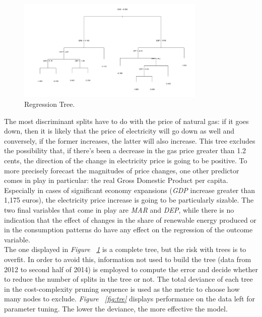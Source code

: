 \documentclass[a4paper,12pt]{book}
\begin{document}
\begin{figure}[tb]
\begin{center}
\captionsetup{justification=centering}
\includegraphics[width=0.8\textwidth]{Images/plot.png}
\caption{Regression Tree.}
\label{fig:plot}
\end{center}
\end{figure}

The most discriminant splits have to do with the price of natural gas: if it goes down, then it is likely that the price of electricity will go down as well and conversely, if the former increases, the latter will also increase. This tree excludes the possibility that, if there's been a decrease in the gas price greater than 1.2 cents, the direction of the change in electricity price is going to be positive. To more precisely forecast the magnitudes of price changes, one other predictor comes in play in particular: the real Gross Domestic Product per capita. Especially in cases of significant economy expansions (\textit{GDP} increase greater than 1,175 euros), the electricity price increase is going to be particularly sizable. The two final variables that come in play are \textit{MAR} and \textit{DEP}, while there is no indication that the effect of changes in the share of renewable energy produced or in the consumption patterns do have any effect on the regression of the outcome variable.\\

The one displayed in \textit{Figure ~\ref{fig:plot}} is a complete tree, but the risk with trees is to overfit. In order to avoid this, information not used to build the tree (data from 2012 to second half of 2014) is employed to compute the error and decide whether to reduce the number of splits in the tree or not. The total deviance of each tree in the cost-complexity pruning sequence is used as the metric to choose how many nodes to exclude. \textit{Figure ~\ref{fig:tre}} displays performance on the data left for parameter tuning. The lower the deviance, the more effective the model.
\end{document}
